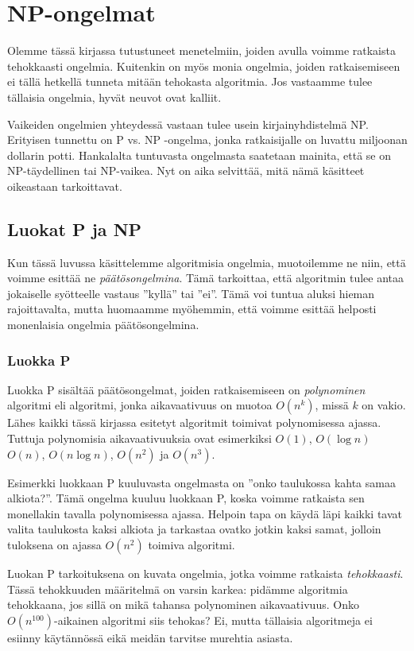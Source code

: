 \chapter{NP-ongelmat}

Olemme tässä kirjassa tutustuneet menetelmiin, joiden avulla voimme
ratkaista tehokkaasti ongelmia.
Kuitenkin on myös monia ongelmia, joiden ratkaisemiseen ei tällä
hetkellä tunneta mitään tehokasta algoritmia.
Jos vastaamme tulee tällaisia ongelmia, hyvät neuvot ovat kalliit.

Vaikeiden ongelmien yhteydessä vastaan tulee usein
kirjainyhdistelmä NP.
Erityisen tunnettu on P vs. NP -ongelma,
jonka ratkaisijalle on luvattu miljoonan dollarin potti.
Hankalalta tuntuvasta ongelmasta saatetaan mainita, että
se on NP-täydellinen tai NP-vaikea.
Nyt on aika selvittää, mitä nämä käsitteet oikeastaan tarkoittavat.

\section{Luokat P ja NP}

Kun tässä luvussa käsittelemme algoritmisia ongelmia,
muotoilemme ne niin, että voimme esittää ne \emph{päätösongelmina}.
Tämä tarkoittaa, että algoritmin tulee antaa jokaiselle syötteelle
vastaus ''kyllä'' tai ''ei''.
Tämä voi tuntua aluksi hieman rajoittavalta, mutta huomaamme myöhemmin,
että voimme esittää helposti monenlaisia ongelmia päätösongelmina.

\subsection{Luokka P}

Luokka P sisältää päätösongelmat, joiden ratkaisemiseen on
\emph{polynominen} algoritmi eli algoritmi, jonka aikavaativuus
on muotoa $O(n^k)$, missä $k$ on vakio.
Lähes kaikki tässä kirjassa esitetyt algoritmit toimivat
polynomisessa ajassa.
Tuttuja polynomisia aikavaativuuksia ovat esimerkiksi
$O(1)$, $O(\log n)$ $O(n)$, $O(n \log n)$, $O(n^2)$ ja $O(n^3)$.

Esimerkki luokkaan P kuuluvasta ongelmasta on
''onko taulukossa kahta samaa alkiota?''.
Tämä ongelma kuuluu luokkaan P, koska voimme ratkaista
sen monellakin tavalla polynomisessa ajassa.
Helpoin tapa on käydä läpi kaikki tavat valita taulukosta
kaksi alkiota ja tarkastaa ovatko jotkin kaksi samat,
jolloin tuloksena on ajassa $O(n^2)$ toimiva algoritmi.

Luokan P tarkoituksena on kuvata ongelmia, jotka voimme
ratkaista \emph{tehokkaasti}.
Tässä tehokkuuden määritelmä on varsin karkea:
pidämme algoritmia tehokkaana, jos sillä on mikä tahansa
polynominen aikavaativuus.
Onko $O(n^{100})$-aikainen algoritmi siis tehokas?
Ei, mutta tällaisia algoritmeja ei esiinny käytännössä
eikä meidän tarvitse murehtia asiasta.

